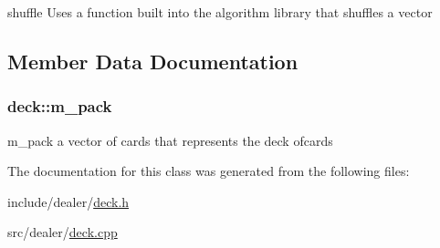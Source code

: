 shuffle Uses a function built into the algorithm library that shuffles a vector 



\subsection{Member Data Documentation}
\hypertarget{classdeck_a21e8795379e3fe381f3b63ba2c629ef5}{
\subsubsection[{m\-\_\-pack}]{ deck\-::m\-\_\-pack\hspace{0.3cm}{\ttfamily [private]}}}\label{classdeck_a21e8795379e3fe381f3b63ba2c629ef5}


m\-\_\-pack a vector of cards that represents the deck ofcards 



The documentation for this class was generated from the following files\-:\begin{DoxyCompactItemize}
\item 
include/dealer/\hyperlink{deck_8h}{deck.\-h}\item 
src/dealer/\hyperlink{deck_8cpp}{deck.\-cpp}\end{DoxyCompactItemize}
